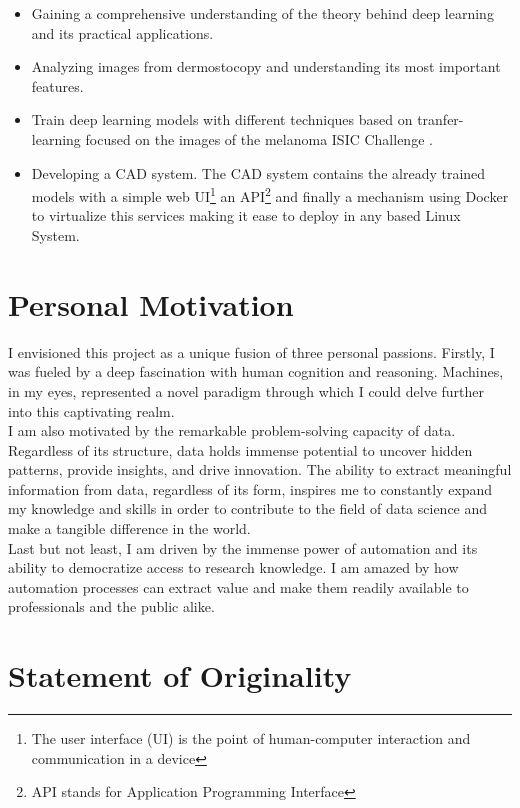\begin{itemize}
    \item Gaining a comprehensive understanding of the theory behind deep learning and its practical applications.
    \item Analyzing images from dermostocopy and understanding its most important features.
    \item Train deep learning models with different techniques based on tranfer-learning focused on the images of the melanoma ISIC Challenge \cite{IsicChallenge}.
    \item Developing a CAD system. The CAD system contains the already trained models with a simple web UI\footnote{The user interface (UI) is the point of human-computer interaction and communication in a device} an API\footnote{API stands for Application Programming Interface} and finally a mechanism using Docker to virtualize this services making it ease to deploy in any based Linux System.
\end{itemize}

\section{Personal Motivation}

I envisioned this project as a unique fusion of three personal passions. Firstly, I was fueled by a deep fascination with human cognition and reasoning. Machines, in my eyes, represented a novel paradigm through which I could delve further into this captivating realm. \\

I am also motivated by the remarkable problem-solving capacity of data. Regardless of its structure, data holds immense potential to uncover hidden patterns, provide insights, and drive innovation. The ability to extract meaningful information from data, regardless of its form, inspires me to constantly expand my knowledge and skills in order to contribute to the field of data science and make a tangible difference in the world. \\

Last but not least, I am driven by the immense power of automation and its ability to democratize access to research knowledge. I am amazed by how automation processes can extract value and make them readily available to professionals and the public alike.

\section{Statement of Originality}

